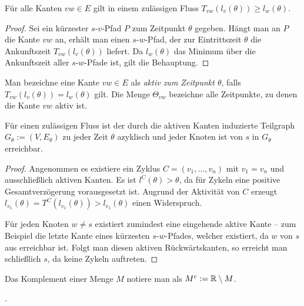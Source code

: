 \begin{lemma}\label{lemma-dreicksungl}
	Für alle Kanten $vw\in E$ gilt in einem zulässigen Fluss 
	$T_{vw}(l_v(\theta)) \geq l_w(\theta)$.
\end{lemma}
\begin{proof}
	Sei ein kürzester $s$-$v$-Pfad $P$ zum Zeitpunkt $\theta$ gegeben.
	Hängt man an $P$ die Kante $vw$ an, erhält man einen $s$-$w$-Pfad, der zur Eintrittszeit $\theta$ die Ankunftszeit $T_{vw}(l_v(\theta))$ liefert.
	Da $l_w(\theta)$ das Minimum über die Ankunftszeit aller $s$-$w$-Pfade ist, gilt die Behauptung.
\end{proof}

\begin{definition}
	Man bezeichne eine Kante $vw\in E$ als \emph{aktiv zum Zeitpunkt $\theta$}, falls $T_{vw}(l_v(\theta)) = l_w(\theta)$ gilt.
	Die Menge $\Theta_{vw}$ bezeichne alle Zeitpunkte, zu denen die Kante $vw$ aktiv ist.
\end{definition}

\begin{lemma}\label{lemma-shortest-path-using-active-edges}
	Für einen zulässigen Fluss ist der durch die aktiven Kanten induzierte Teilgraph $G_\theta:=(V, E_\theta)$ zu jeder Zeit $\theta$ azyklisch und jeder Knoten ist von $s$ in $G_\theta$ erreichbar.
\end{lemma}
\begin{proof}
	Angenommen es existiere ein Zyklus $C=(v_1, \dots, v_n)$ mit $v_1=v_n$ und ausschließlich aktiven Kanten.
	Es ist $l^C(\theta) > \theta$, da für Zykeln eine positive Gesamtverzögerung vorausgesetzt ist.
	Augrund der Aktivität von $C$ erzeugt $l_{v_1}(\theta) = T^C(l_{v_1}(\theta)) > l_{v_1}(\theta)$ einen Widerspruch.
	
	Für jeden Knoten $w\neq s$ existiert zumindest eine eingehende aktive Kante -- zum Beispiel die letzte Kante eines kürzesten $s$-$w$-Pfades, welcher existiert, da $w$ von $s$ aus erreichbar ist.
	Folgt man diesen aktiven Rückwärtskanten, so erreicht man schließlich $s$, da keine Zykeln auftreten.
\end{proof}

\begin{notation}
	Das Komplement einer Menge $M$ notiere man als $M^c:= \mathbb{R}\setminus M$.
\end{notation}

.

